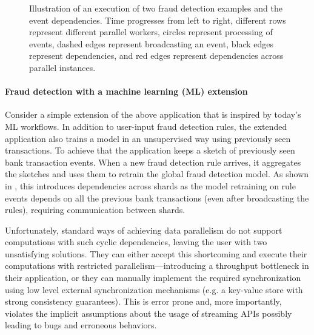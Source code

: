\begin{figure}[t]
    \caption{Illustration of an execution of two fraud detection
      examples and the event dependencies. Time progresses from left to right,
            different rows represent different parallel workers,
                  circles represent processing of
      events, dashed edges represent broadcasting an event,
            black edges represent dependencies, and red edges
      represent dependencies across parallel instances.
      }
    \label{dgs:fig:dependencies-vis}
\end{figure}

\paragraph{Fraud detection with a machine learning (ML) extension}
Consider a simple extension of the above application that is inspired
by today's ML workflows. In addition to user-input fraud detection
rules, the extended application also trains a model in an unsupervised
way using previously seen transactions. To achieve that the application keeps a sketch of previously seen bank transaction events. When a new fraud detection rule arrives, it aggregates the sketches and uses them to retrain the global fraud detection model.
As shown in
,
this introduces dependencies across shards as the model retraining on rule events depends on all the previous bank transactions (even after broadcasting the rules), requiring communication between shards.

Unfortunately, standard ways of achieving data parallelism do not
support computations with such cyclic dependencies, leaving the user with two
unsatisfying solutions. They can either accept this
shortcoming and execute their computations with restricted parallelism---introducing
a throughput bottleneck in their application, or they can manually
implement the required synchronization using low level external
synchronization mechanisms (e.g. a key-value store with strong
consistency guarantees). This is error prone and, more importantly,
violates the implicit assumptions about the usage of
streaming APIs possibly leading to bugs and
erroneous behaviors.

